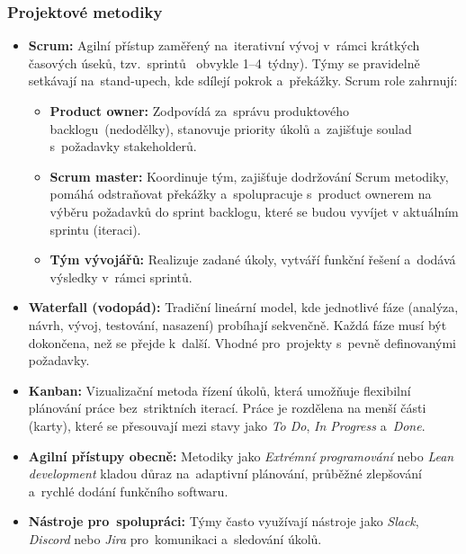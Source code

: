 \documentclass[male,czech,api_bc]{kitheses}
\begin{document}
\subsubsection{Projektové metodiky}

\begin{itemize}
	\item \textbf{Scrum:} Agilní přístup zaměřený na~iterativní vývoj v~rámci krátkých časových úseků, tzv.~sprintů ~obvykle 1--4~týdny). Týmy se pravidelně setkávají na~stand-upech, kde sdílejí pokrok a~překážky. Scrum role zahrnují:
	\begin{itemize}
		\item \textbf{Product owner:} Zodpovídá za~správu produktového backlogu~(nedodělky), stanovuje priority úkolů a~zajišťuje soulad s~požadavky stakeholderů.
		\item \textbf{Scrum master:} Koordinuje tým, zajišťuje dodržování Scrum metodiky, pomáhá odstraňovat překážky a~spolupracuje s~product ownerem na výběru požadavků do sprint backlogu, které se budou vyvíjet v aktuálním sprintu (iteraci).
		\item \textbf{Tým vývojářů:} Realizuje zadané úkoly, vytváří funkční řešení a~dodává výsledky v~rámci sprintů.
	\end{itemize}
	
	\item \textbf{Waterfall (vodopád):} Tradiční lineární model, kde jednotlivé fáze (analýza, návrh, vývoj, testování, nasazení) probíhají sekvenčně. Každá fáze musí být dokončena, než se přejde k~další. Vhodné pro~projekty s~pevně definovanými požadavky.
	
	\item \textbf{Kanban:} Vizualizační metoda řízení úkolů, která umožňuje flexibilní plánování práce bez~striktních iterací. Práce je rozdělena na menší části (karty), které se přesouvají mezi stavy jako \textit{To Do}, \textit{In Progress} a~\textit{Done}.
	
	\item \textbf{Agilní přístupy obecně:} Metodiky jako \textit{Extrémní programování} nebo \textit{Lean development} kladou důraz na~adaptivní plánování, průběžné zlepšování a~rychlé dodání funkčního softwaru.
	
	\item \textbf{Nástroje pro~spolupráci:} Týmy často využívají nástroje jako \textit{Slack}, \textit{Discord} nebo \textit{Jira} pro~komunikaci a~sledování úkolů.
\end{itemize}
\end{document}
